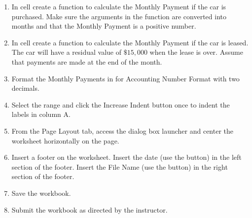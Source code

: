 \begin{enumerate}[resume]
	\item In cell  create a  function to calculate the Monthly Payment if the car is purchased. Make sure the arguments in the  function are converted into months and that the Monthly Payment is a positive number.
	
	\item In cell  create a  function to calculate the Monthly Payment if the car is leased. The car will have a residual value of $ \$15,000 $ when the lease is over. Assume that payments are made at the end of the month.
	
	\item Format the Monthly Payments in  for Accounting Number Format with two decimals.
	
	\item Select the range  and click the Increase Indent button once to indent the labels in column A.
	
	\item From the Page Layout tab, access the  dialog box launcher and center the  worksheet horizontally on the page.
	
	\item Insert a footer on the  worksheet. Insert the date (use the  button) in the left section of the footer. Insert the File Name (use the  button) in the right section of the footer.
	
	\item Save the  workbook.
	
	\item Submit the  workbook as directed by the instructor.
\end{enumerate}